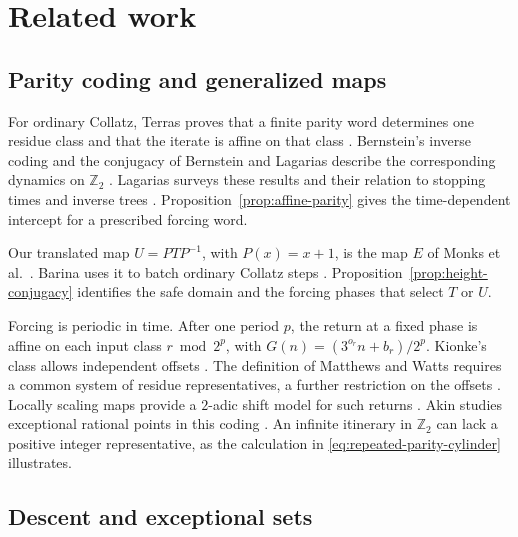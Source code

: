 \section{Related work}
\label{sec:related-work}

\subsection{Parity coding and generalized maps}

For ordinary Collatz, Terras proves that a finite parity word determines
one residue class and that the iterate is affine on that class
\cite{terras-1976}. Bernstein's inverse coding and the conjugacy of
Bernstein and Lagarias describe the corresponding dynamics on
$\mathbb Z_2$ \cite{bernstein-1994,bernstein-lagarias-1996}. Lagarias
surveys these results and their relation to stopping times and inverse
trees \cite{lagarias-1985}. Proposition~\ref{prop:affine-parity} gives
the time-dependent intercept for a prescribed forcing word.

Our translated map $U=PTP^{-1}$, with $P(x)=x+1$, is the map $E$ of
Monks et al.\ \cite[Section~3]{monks-et-al-2013}. Barina uses it to
batch ordinary Collatz steps \cite[Section~3.1]{barina-2025}.
Proposition~\ref{prop:height-conjugacy} identifies the safe domain and
the forcing phases that select $T$ or $U$.

Forcing is periodic in time. After one period $p$, the return at a fixed
phase is affine on each input class $r\bmod 2^p$, with
$G(n)=(3^{o_r}n+b_r)/2^p$. Kionke's class allows independent offsets
\cite[Section~1]{kionke-2017}. The definition of Matthews and Watts
requires a common system of residue representatives, a further
restriction on the offsets \cite[p.~167, equation~(1.3)]{matthews-watts-1984}.
Locally scaling maps provide a $2$-adic shift model for such returns
\cite[Theorem~4.8 of the preprint]{kingsbery-et-al-2011}. Akin studies
exceptional rational points in this coding \cite{akin-2004}. An infinite
itinerary in $\mathbb Z_2$ can lack a positive integer representative,
as the calculation in \eqref{eq:repeated-parity-cylinder} illustrates.

\subsection{Descent and exceptional sets}
\label{sec:density-literature}


